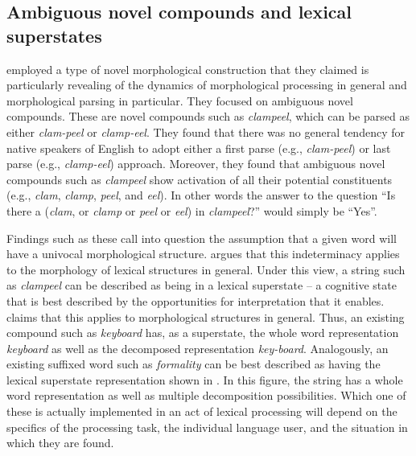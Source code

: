 \documentclass[output=paper]{langsci/langscibook}
\begin{document}
\subsection{Ambiguous novel compounds and lexical superstates}\label{sec:libben:1.3}\largerpage

\citet{LibbenDerwingdeAlmeida1999} employed a type of novel morphological construction that they claimed is particularly revealing of the dynamics of morphological processing in general and morphological parsing in particular.  They focused on ambiguous novel compounds. These are novel compounds such as \textit{clampeel}, which can be parsed as either \textit{clam-peel} or \textit{clamp-eel}.  They found that there was no general tendency for native speakers of English to adopt either a first parse (e.g., \textit{clam-peel}) or last parse (e.g., \textit{clamp-eel}) approach. Moreover, they found that ambiguous novel compounds such as \textit{clampeel} show activation of all their potential constituents (e.g., \textit{clam}, \textit{clamp}, \textit{peel}, and \textit{eel}). In other words the answer to the question “Is there a (\textit{clam}, or \textit{clamp} or \textit{peel} or \textit{eel}) in \textit{clampeel}?” would simply be “Yes”.

Findings such as these call into question the assumption that a given word will have a univocal morphological structure.  \citet{Libbeninpress} argues that this indeterminacy applies to the morphology of lexical structures in general.  Under this view, a string such as \textit{clampeel} can be described as being in a lexical superstate – a cognitive state that is best described by the opportunities for interpretation that it enables.  \citet{Libbeninpress} claims that this applies to morphological structures in general. Thus, an existing compound such as \textit{keyboard} has, as a superstate, the whole word representation \textit{keyboard} as well as the decomposed representation \textit{key-board}. Analogously, an existing suffixed word such as \textit{formality} can be best described as having the lexical superstate representation shown in . In this figure, the string has a whole word representation as well as multiple decomposition possibilities. Which one of these is actually implemented in an act of lexical processing will depend on the specifics of the processing task, the individual language user, and the situation in which they are found.
\end{document}
